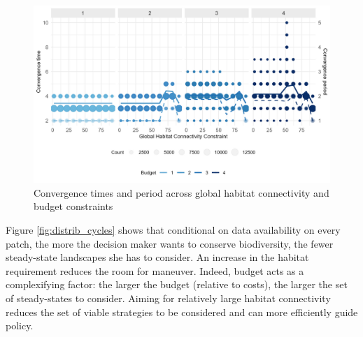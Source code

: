 \begin{figure}[h]
    \centering
    \includegraphics[width = .8\textwidth]{figures/wildland/convergence_times.jpg}
    \caption{Convergence times and period across global habitat connectivity and budget constraints}
    
    \label{fig:convergence_time}
\end{figure}


Figure \ref{fig:distrib_cycles} shows that conditional on data availability on every patch, the more the decision maker wants to conserve biodiversity, the fewer steady-state landscapes she has to consider. An increase in the habitat requirement reduces the room for maneuver. Indeed, budget acts as a complexifying factor: the larger the budget (relative to costs), the larger the set of steady-states to consider. 
Aiming for relatively large habitat connectivity reduces the set of viable strategies to be considered and can more efficiently guide policy. 

